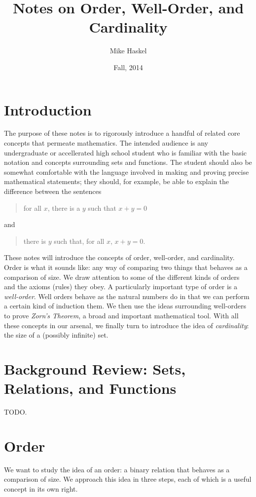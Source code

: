 \documentclass[letterpaper]{article}
\title{Notes on Order, Well-Order, and Cardinality}
\author{Mike Haskel}
\date{Fall, 2014}
\theoremstyle{definition}
\begin{document}
\maketitle

\section{Introduction}
The purpose of these notes is to rigorously introduce a handful of
related core concepts that permeate mathematics.  The intended
audience is any undergraduate or accellerated high school student who
is familiar with the basic notation and concepts surrounding sets and
functions.  The student should also be somewhat comfortable with the
language involved in making and proving precise mathematical
statements; they should, for example, be able to explain the
difference between the sentences
\begin{quote}
  for all $x$, there is a $y$ such that $x+y=0$
\end{quote}
and
\begin{quote}
  there is $y$ such that, for all $x$, $x+y=0$.
\end{quote}

These notes will introduce the concepts of order, well-order, and
cardinality.  Order is what it sounds like: any way of comparing two
things that behaves as a comparison of size.  We draw attention to
some of the different kinds of orders and the axioms (rules) they
obey.  A particularly important type of order is a \emph{well-order}.
Well orders behave as the natural numbers do in that we can perform a
certain kind of induction them.  We then use the ideas surrounding
well-orders to prove \emph{Zorn's Theorem}, a broad and important
mathematical tool.  With all these concepts in our arsenal, we finally
turn to introduce the idea of \emph{cardinality}: the size of a
(possibly infinite) set.

\section{Background Review: Sets, Relations, and Functions}
TODO.

\section{Order}
We want to study the idea of an order: a binary relation that behaves
as a comparison of size.  We approach this idea in three steps, each
of which is a useful concept in its own right.
\end{document}
